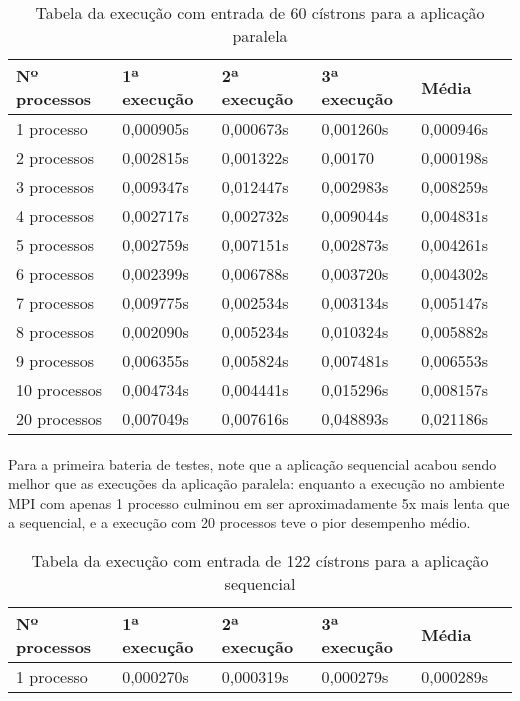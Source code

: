 \documentclass[a4paper,10pt]{article}
\begin{document}
\begin{table}[!htb]
\begin{tabular}{| l | l | l | l | l | p{5cm} |} 
\hline
  Nº processos & 1ª execução & 2ª execução & 3ª execução & Média\\ \hline
1 processo   &	0,000905s &    0,000673s    & 0,001260s  &  0,000946s \\ \hline
2 processos &	0,002815s  &    0,001322s    & 0,00170    &  0,000198s\\ \hline
3 processos & 0,009347s  &  0,012447s  &  0,002983s  &  0,008259s  \\ \hline
4 processos & 0,002717s  &  0,002732s  &  0,009044s  &  0,004831s  \\ \hline
5 processos & 0,002759s  &  0,007151s  &  0,002873s  &  0,004261s  \\ \hline
6 processos & 0,002399s  &  0,006788s  &  0,003720s  &  0,004302s  \\ \hline
7 processos & 0,009775s  & 0,002534s  &  0,003134s  &  0,005147s\\ \hline
8 processos & 0,002090s  &  0,005234s  &  0,010324s  &  0,005882s  \\ \hline
9 processos & 0,006355s  &  0,005824s  &  0,007481s  &  0,006553s \\ \hline
10 processos & 0,004734s  &  0,004441s  &  0,015296s  &  0,008157s \\ \hline
20 processos & 0,007049s  &  0,007616s  &  0,048893s  &  0,021186s \\ \hline 
\end{tabular}
\caption{Tabela da execução com entrada de 60 cístrons para a aplicação paralela}
\end{table}

\paragraph{} Para a primeira bateria de testes, note que a aplicação sequencial acabou sendo melhor que as execuções da aplicação paralela: enquanto a execução no ambiente MPI com apenas 1 processo culminou em ser aproximadamente 5x mais lenta que a sequencial, e a execução com 20 processos teve o pior desempenho médio.\\
\newpage
\begin{table}[!htb]
\begin{tabular}{| l | l | l | l | l | p{5cm} |} 
\hline
  Nº processos & 1ª execução & 2ª execução & 3ª execução & Média\\ \hline
1 processo   &	0,000270s  &    0,000319s   & 0,000279s   &  0,000289s\\ \hline

\end{tabular}
\caption{Tabela da execução com entrada de 122 cístrons para a aplicação sequencial}
\end{table}
\end{document}
